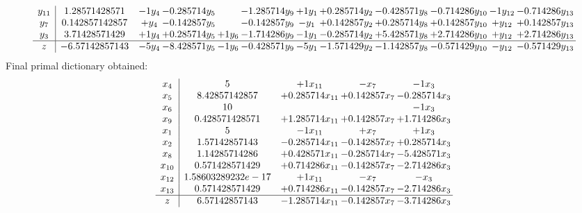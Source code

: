 \documentclass[11pt]{article}
\begin{document}
\[\begin{array}{c| c c@{\hskip 2pt} c@{\hskip 2pt} c@{\hskip 2pt} c@{\hskip 2pt} c@{\hskip 2pt} c@{\hskip 2pt} c@{\hskip 2pt} c@{\hskip 2pt} c@{\hskip 2pt} c@{\hskip 2pt} }
 y_{11}   &  1.28571428571 & -1 y_{4} & -0.285714 y_{5} &   & -1.285714 y_{9} & + 1 y_{1} & + 0.285714 y_{2} & -0.428571 y_{8} & -0.714286 y_{10} & -1 y_{12} & -0.714286 y_{13}\\
 y_{7}   &  0.142857142857 & +  y_{4} & -0.142857 y_{5} &   & -0.142857 y_{9} & - y_{1} & + 0.142857 y_{2} & + 0.285714 y_{8} & + 0.142857 y_{10} & +  y_{12} & + 0.142857 y_{13}\\
 y_{3}   &  3.71428571429 & + 1 y_{4} & + 0.285714 y_{5} & + 1 y_{6} & -1.714286 y_{9} & -1 y_{1} & -0.285714 y_{2} & + 5.428571 y_{8} & + 2.714286 y_{10} & +  y_{12} & + 2.714286 y_{13}\\
\hline
z    &  -6.57142857143 & -5 y_{4} & -8.428571 y_{5} & -1 y_{6} & -0.428571 y_{9} & -5 y_{1} & -1.571429 y_{2} & -1.142857 y_{8} & -0.571429 y_{10} & - y_{12} & -0.571429 y_{13}\\
\end{array}\]
 Final primal dictionary obtained: 
\[\begin{array}{c| c c@{\hskip 2pt} c@{\hskip 2pt} c@{\hskip 2pt} }
 x_{4}   &  5 & + 1 x_{11} & - x_{7} & -1 x_{3}\\
 x_{5}   &  8.42857142857 & + 0.285714 x_{11} & + 0.142857 x_{7} & -0.285714 x_{3}\\
 x_{6}   &  10  &    &   & -1 x_{3}\\
 x_{9}   &  0.428571428571 & + 1.285714 x_{11} & + 0.142857 x_{7} & + 1.714286 x_{3}\\
 x_{1}   &  5 & -1 x_{11} & +  x_{7} & + 1 x_{3}\\
 x_{2}   &  1.57142857143 & -0.285714 x_{11} & -0.142857 x_{7} & + 0.285714 x_{3}\\
 x_{8}   &  1.14285714286 & + 0.428571 x_{11} & -0.285714 x_{7} & -5.428571 x_{3}\\
 x_{10}   &  0.571428571429 & + 0.714286 x_{11} & -0.142857 x_{7} & -2.714286 x_{3}\\
 x_{12}   &  1.58603289232e-17 & + 1 x_{11} & - x_{7} & - x_{3}\\
 x_{13}   &  0.571428571429 & + 0.714286 x_{11} & -0.142857 x_{7} & -2.714286 x_{3}\\
\hline
z    &  6.57142857143 & -1.285714 x_{11} & -0.142857 x_{7} & -3.714286 x_{3}\\
\end{array}\]
\end{document}
